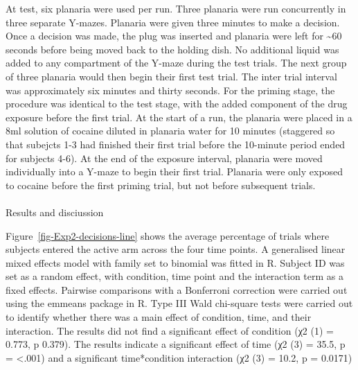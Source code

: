 \documentclass[
  letterpaper,
  DIV=11,
  numbers=noendperiod,
  oneside]{scrartcl}
\makeatletter
\let\oldparagraph\paragraph
\renewcommand{\paragraph}{
    \@ifstar
      \xxxParagraphStar
      \xxxParagraphNoStar
  }
\newcommand{\xxxParagraphStar}[1]{\oldparagraph*{#1}\mbox{}}
\newcommand{\xxxParagraphNoStar}[1]{\oldparagraph{#1}\mbox{}}
\makeatother
\begin{document}
At test, six planaria were used per run. Three planaria were run
concurrently in three separate Y-mazes. Planaria were given three
minutes to make a decision. Once a decision was made, the plug was
inserted and planaria were left for \textasciitilde60 seconds before
being moved back to the holding dish. No additional liquid was added to
any compartment of the Y-maze during the test trials. The next group of
three planaria would then begin their first test trial. The inter trial
interval was approximately six minutes and thirty seconds. For the
priming stage, the procedure was identical to the test stage, with the
added component of the drug exposure before the first trial. At the
start of a run, the planaria were placed in a 8ml solution of cocaine
diluted in planaria water for 10 minutes (staggered so that subejcts 1-3
had finished their first trial before the 10-minute period ended for
subjects 4-6). At the end of the exposure interval, planaria were moved
individually into a Y-maze to begin their first trial. Planaria were
only exposed to cocaine before the first priming trial, but not before
subsequent trials.

\paragraph{Results and disciussion}\label{results-and-disciussion}

Figure~\ref{fig-Exp2-decisions-line} shows the average percentage of
trials where subjects entered the active arm across the four time
points. A generalised linear mixed effects model with family set to
binomial was fitted in R. Subject ID was set as a random effect, with
condition, time point and the interaction term as a fixed effects.
Pairwise comparisons with a Bonferroni correction were carried out using
the emmeans package in R. Type III Wald chi-square tests were carried
out to identify whether there was a main effect of condition, time, and
their interaction. The results did not find a significant effect of
condition (χ2 (1) = 0.773, p 0.379). The results indicate a significant
effect of time (χ2 (3) = 35.5, p = \textless.001) and a significant
time*condition interaction (χ2 (3) = 10.2, p = 0.0171)
\end{document}
